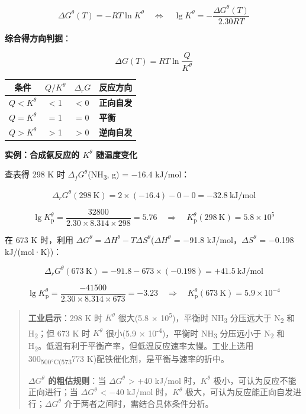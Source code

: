 \documentclass[a4paper,11pt]{ctexart}
\newcounter{none}
\newcommand{\箭}{\ensuremath{\rightarrow}}
\newcommand{\左箭}{\ensuremath{\leftarrow}}
\newcommand{\上箭}{\ensuremath{\uparrow}}
\newcommand{\下箭}{\ensuremath{\downarrow}}
\newcommand{\衡}{\ensuremath{\rightleftharpoons}}
\newcommand{\双箭}{\ensuremath{\leftrightarrow}}
\newcommand{\约等于}{\ensuremath{\approx}}
\newcommand{\小于等于}{\ensuremath{\leq}}
\newcommand{\大于等于}{\ensuremath{\geq}}
\newcommand{\不等于}{\ensuremath{\neq}}
\newcommand{\西格马}{\ensuremath{\sigma}}
\newcommand{\派}{\ensuremath{\pi}}
\begin{document}
\[
\boxed{\Delta G^\theta(T) = -RT\ln K^\theta \quad \Longleftrightarrow \quad \lg K^\theta = -\frac{\Delta G^\theta(T)}{2.30RT}}
\]

\textbf{综合得方向判据}：

\[
\Delta G(T) = RT\ln\frac{Q}{K^\theta}
\]

{\def\LTcaptype{none} %
\begin{longtable}[]{@{}cccl@{}}
\toprule\noalign{}
条件 & \(Q/K^\theta\) & \(\Delta_rG\) & 反应方向 \\
\midrule\noalign{}
\endhead
\bottomrule\noalign{}
\endlastfoot
\(Q < K^\theta\) & \textless{} 1 & \textless{} 0 & \textbf{正向自发} \\
\(Q = K^\theta\) & = 1 & = 0 & \textbf{平衡} \\
\(Q > K^\theta\) & \textgreater{} 1 & \textgreater{} 0 & \textbf{逆向自发} \\
\end{longtable}
}

\textbf{实例：合成氨反应的 \(K^\theta\) 随温度变化}

查表得 298 K 时 \(\Delta_f G^\theta\)(NH\textsubscript{3}, g) = −16.4 kJ/mol：

\[
\Delta_r G^\theta(298\ \mathrm{K}) = 2 \times (-16.4) - 0 - 0 = -32.8\ \mathrm{kJ/mol}
\]

\[
\lg K_{\mathrm p}^\theta = \frac{32800}{2.30 \times 8.314 \times 298} = 5.76 \quad \Rightarrow \quad K_{\mathrm p}^\theta(298\ \mathrm{K}) = 5.8 \times 10^5
\]

在 673 K 时，利用 \(\Delta G^\theta = \Delta H^\theta - T\Delta S^\theta\)(\(\Delta H^\theta\) = −91.8 kJ/mol，\(\Delta S^\theta\) = −0.198 kJ/(mol·K))：

\[
\Delta_r G^\theta(673\ \mathrm{K}) = -91.8 - 673 \times (-0.198) = +41.5\ \mathrm{kJ/mol}
\]

\[
\lg K_{\mathrm p}^\theta = \frac{-41500}{2.30 \times 8.314 \times 673} = -3.23 \quad \Rightarrow \quad K_{\mathrm p}^\theta(673\ \mathrm{K}) = 5.9 \times 10^{-4}
\]

\begin{quote}
\textbf{工业启示}：298 K 时 \(K^\theta\) 很大(5.8 × 10\textsuperscript{5})，平衡时 NH\textsubscript{3} 分压远大于 N\textsubscript{2} 和 H\textsubscript{2}；但 673 K 时 \(K^\theta\) 很小(5.9 × 10\textsuperscript{-4})，平衡时 NH\textsubscript{3} 分压远小于 N\textsubscript{2} 和 H\textsubscript{2}。低温有利于平衡产率，但低温反应速率太慢。工业上选用 300\textsubscript{500°C(573}773 K)配铁催化剂，是平衡与速率的折中。

\textbf{\(\Delta G^\theta\) 的粗估规则}：当 \(\Delta G^\theta\) \textgreater{} +40 kJ/mol 时，\(K^\theta\) 极小，可认为反应不能正向进行；当 \(\Delta G^\theta\) \textless{} −40 kJ/mol 时，\(K^\theta\) 极大，可认为反应能正向自发进行；\(\Delta G^\theta\) 介于两者之间时，需结合具体条件分析。
\end{quote}
\end{document}
